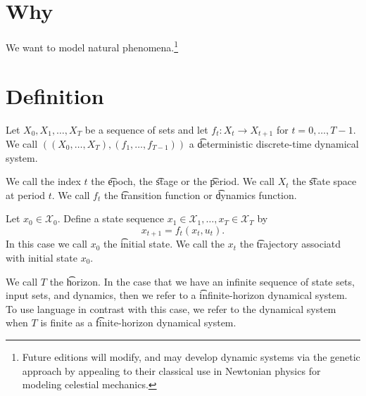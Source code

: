 

\section*{Why}

We want to model natural phenomena.\footnote{Future editions will modify, and may develop dynamic systems via the genetic approach by appealing to their classical use in Newtonian physics for modeling celestial mechanics.}

\section*{Definition}

Let $X_0, X_1, \dots , X_T$ be a sequence of sets and let $f_t: X_t \to X_{t+1}$ for $t = 0, \dots , T-1$.
We call $((X_0, \dots , X_T), (f_1, \dots , f_{T-1}))$ a \t{deterministic discrete-time dynamical system}.

We call the index $t$ the \t{epoch}, the \t{stage} or the \t{period}.
We call $X_t$ the \t{state space} at period $t$.
We call $f_t$ the \t{transition function} or \t{dynamics function}.

Let $x_0 \in \mathcal{X} _0$. Define a state sequence $x_1 \in \mathcal{X} _1, \dots , x_T \in \mathcal{X} _T$ by
\[
x_{t+1} = f_t(x_t, u_t).
\]
In this case we call $x_0$ the \t{initial state}.
We call the $x_t$ the \t{trajectory} associatd with initial state $x_0$.

We call $T$ the \t{horizon}.
In the case that we have an infinite sequence of state sets, input sets, and dynamics, then we refer to a \t{infinite-horizon} dynamical system.
To use language in contrast with this case, we refer to the dynamical system when $T$ is finite as a \t{finite-horizon} dynamical system.

\blankpage